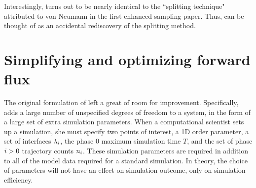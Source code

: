 
Interestingly,  turns out to be nearly identical to the ``splitting technique" attributed to von Neumann in the first enhanced sampling paper\supercite{Kahn:1951es}. Thus,  can be thought of as an accidental rediscovery of the splitting method\supercite{Chong:2017bv}.

%


\section{Simplifying and optimizing forward flux}
The original formulation of \supercite{Allen:2005wy} left a great of room for improvement. Specifically,  adds a large number of unspecified degrees of freedom to a system, in the form of a large set of extra simulation parameters. When a computational scientist sets up a  simulation, she must specify two points of interest, a 1D order parameter, a set of interfaces ${\lambda}_{i}$, the phase $0$ maximum simulation time $T$, and the set of phase $i>0$ trajectory counts $n_{i}$. These simulation parameters are required in addition to all of the model data required for a standard  simulation. In theory, the choice of  parameters will not have an effect on simulation outcome\supercite{Allen:2009kb}, only on simulation efficiency.

